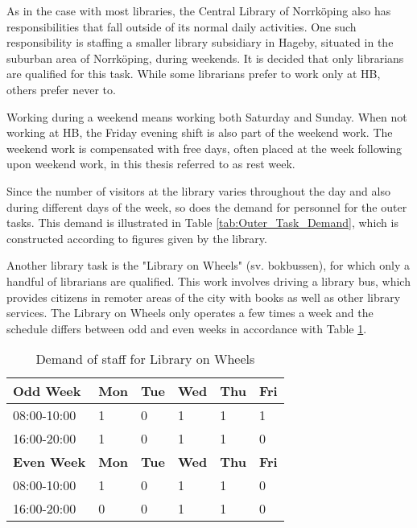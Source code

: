 As in the case with most libraries, the Central Library of Norrköping also has responsibilities that fall outside of its normal daily activities. One such responsibility is staffing a smaller library subsidiary in Hageby, situated in the suburban area of Norrköping, during weekends. It is decided that only librarians are qualified for this task. While some librarians prefer to work only at HB, others prefer never to.

Working during a weekend means working both Saturday and Sunday. When not working at HB, the Friday evening shift is also part of the weekend work. The weekend work is compensated with free days, often placed at the week following upon weekend work, in this thesis referred to as rest week.


Since the number of visitors at the library varies throughout the day and also during different days of the week, so does the demand for personnel for the outer tasks. This demand is illustrated in Table \ref{tab:Outer_Task_Demand}, which is constructed according to figures given by the library. 

Another library task is the "Library on Wheels" (sv. bokbussen), for which only a handful of librarians are qualified. This work involves driving a library bus, which provides citizens in remoter areas of the city with books as well as other library services. The Library on Wheels only operates a few times a week and the schedule differs between odd and even weeks in accordance with Table \ref{tab:LOW_Demand}.

\begin{table}[ht]
\centering
\caption{Demand of staff for Library on Wheels}
\label{tab:LOW_Demand}
\begin{tabularx}{0.80\textwidth}{|l|X|X|X|X|X|}
\hline
 \textbf{Odd Week} & \textbf{Mon} & \textbf{Tue} & \textbf{Wed} & \textbf{Thu} & \textbf{Fri} 
 \\ \hline 
\rowcolor{Gray} 
08:00-10:00 & 1 & 0 & 1 & 1 & 1 
\\ \hline 
\rowcolor{Gray} 
16:00-20:00 & 1 & 0 & 1 & 1 & 0 
\\ \hline 
 \textbf{Even Week} & \textbf{Mon} & \textbf{Tue} & \textbf{Wed} & \textbf{Thu} & \textbf{Fri} 
 \\ \hline 
\rowcolor{Gray} 
08:00-10:00 & 1 & 0 & 1 & 1 & 0 
\\ \hline 
\rowcolor{Gray} 
16:00-20:00 & 0 & 0 & 1 & 1 & 0 
\\ \hline 
\end{tabularx}
\end{table}

